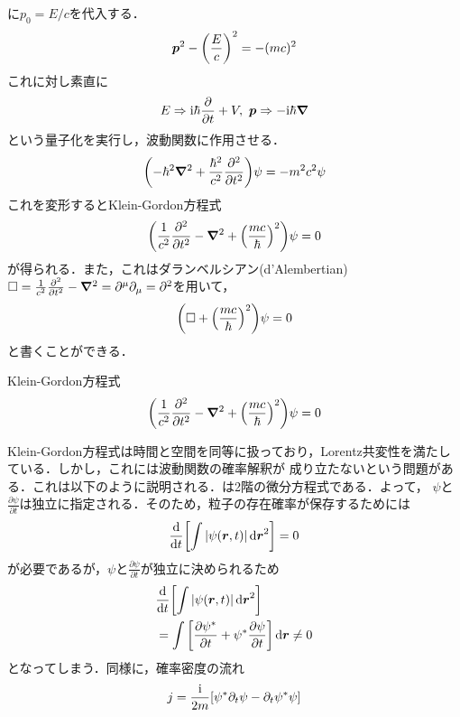 \documentclass{report}
\begin{document}
に$p_0 = E/c$を代入する．
\begin{align}
  \bm{p}^2 - \qty(\frac{E}{c})^2 = -(mc)^2
\end{align}
これに対し素直に
\begin{align}
  E \Rightarrow \mathrm{i}\hbar\frac{\partial}{\partial t} + V,\ \bm{p} \Rightarrow -\mathrm{i}\hbar \grad 
\end{align}
という量子化を実行し，波動関数に作用させる．
\begin{align}
  \qty(-\hbar^2\grad^2 + \frac{\hbar^2}{c^2}\frac{\partial^2}{\partial t^2})\psi = -m^2c^2\psi
\end{align}
これを変形するとKlein-Gordon方程式
\begin{align}
  \qty(\frac{1}{c^2}\frac{\partial^2}{\partial t^2} - \grad^2 + \qty(\frac{mc}{\hbar})^2)\psi = 0 \label{Klein-Gordon-equation}
\end{align}
が得られる．また，これはダランベルシアン(d'Alembertian)$\Box = \frac{1}{c^2}\frac{\partial^2}{\partial t^2} - \grad^2 = \partial^\mu\partial_\mu = \partial^2$を用いて，
\begin{align}
  \qty(\Box + \qty(\frac{mc}{\hbar})^2)\psi = 0
\end{align}
と書くことができる．
\begin{itembox}[l]{Klein-Gordon方程式}
  \begin{equation}
    \qty(\frac{1}{c^2}\frac{\partial^2}{\partial t^2} - \grad^2 + \qty(\frac{mc}{\hbar})^2)\psi = 0
  \end{equation}
\end{itembox}
Klein-Gordon方程式は時間と空間を同等に扱っており，Lorentz共変性を満たしている．しかし，これには波動関数の確率解釈が
成り立たないという問題がある．これは以下のように説明される．は2階の微分方程式である．よって，
$\psi$と$\frac{\partial \psi}{\partial t}$は独立に指定される．そのため，粒子の存在確率が保存するためには
\begin{align}
  \frac{\mathrm{d}}{\dd{t}}\qty[\int \abs{\psi(\bm{r}, t)} \dd{\bm{r}}^2] = 0
\end{align}
が必要であるが，$\psi$と$\frac{\partial \psi}{\partial t}$が独立に決められるため
\begin{align}
  &\frac{\mathrm{d}}{\dd{t}}\qty[\int \abs{\psi(\bm{r}, t)} \dd{\bm{r}}^2]\\
  &= \int \qty[\frac{\partial \psi^{*}}{\partial t} + \psi^{*}\frac{\partial \psi}{\partial t}] \dd{\bm{r}} \neq 0
\end{align}
となってしまう．同様に，確率密度の流れ
\begin{align}
  j = \frac{\mathrm{i}}{2m}[\psi^{*}\partial_t\psi - \partial_t \psi^{*}\psi]
\end{align}
\end{document}
